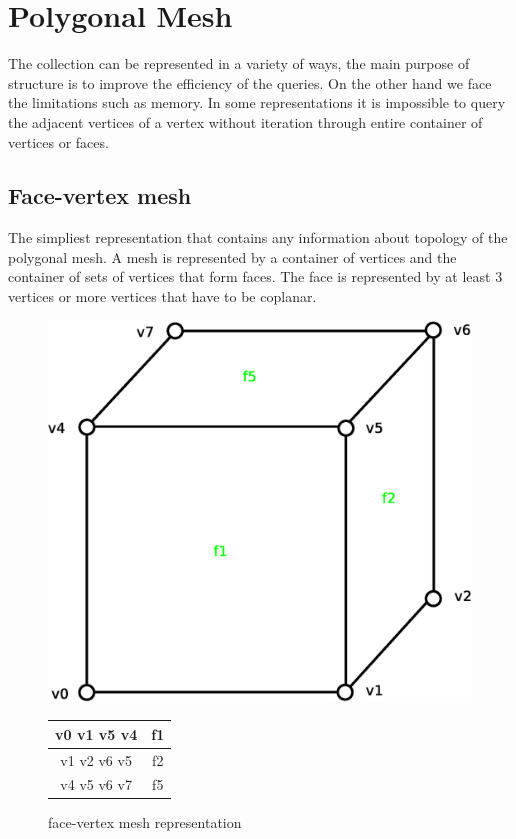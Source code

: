 \section{Polygonal Mesh}
\label{sec:polyg_mesh}
The collection can be represented in a variety of ways, the main purpose of structure is to improve
the efficiency of the queries. On the other hand we face the limitations such as memory. In some
representations it is impossible to query the adjacent vertices of a vertex without iteration through
entire container of vertices or faces.

\subsection{Face-vertex mesh}
\label{sec:face-vertex}

The simpliest representation that contains any information about topology of the polygonal
mesh. A mesh is represented by a container of vertices and the container of sets of vertices that
form faces\cite{Zara2004}. The face is represented by at least 3 vertices or more vertices that have to be
coplanar.\\

\begin{figure}[h]

\begin{minipage}[hb]{0.65\linewidth}
\centering
\includegraphics[width=0.6\linewidth]{../img/fv_rep_mesh.eps}
\label{fig:figure1}
\end{minipage}
\hspace{0.5cm}
\begin{minipage}[hb]{0.25\linewidth}
\centering
\begin{tabular}{|c|c|}
\hline
\textsf{v0 v1 v5 v4} & \textsf{f1}\\
\hline
\textsf{v1 v2 v6 v5} & \textsf{f2}\\
\hline
\textsf{v4 v5 v6 v7} & \textsf{f5}\\
\hline
\end{tabular}
\label{fig:fv_mesh}
\end{minipage}

\caption{face-vertex mesh representation}
\end{figure}

